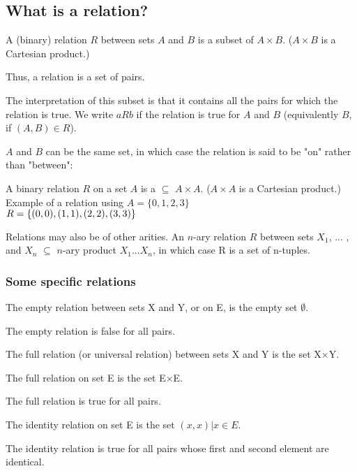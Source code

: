 \subsection{What is a relation?}

A (binary) relation $R$ between sets $A$ and $B$ is a subset of $A \times B$. ($A \times B$ is a Cartesian product.) 

Thus, a relation is a set of pairs. 

The interpretation of this subset is that it contains all the pairs for which the relation is true.  We write $aRb$ if the relation is true for $A$ and $B$ (equivalently $B$, if $(A,B) \in R$). 

$A$ and $B$ can be the same set, in which case the relation is said to be "on" rather than "between":

A binary relation $R$ on a set $A$ is a $\subseteq$ $A \times A$. ($A \times A$ is a Cartesian product.) \\

Example of a relation using $A = \{0,1,2,3\}$ \\

 \begin{math}
    R = \{(0,0),(1,1),(2,2),(3,3)\}  \\
\end{math}

Relations may also be of other arities.  An $n$-ary relation $R$ between sets $X_{1}$, ... , and $X_{n}$ $\subseteq$  $n$-ary product $X_{1}$...$X_{n}$, in which case R is a set of n-tuples. 

\subsubsection{Some specific relations}
The empty relation between sets X and Y, or on E, is the empty set $\emptyset$. 

The empty relation is false for all pairs. 

The full relation (or universal relation) between sets X and Y is the set X$\times$Y. 

The full relation on set E is the set E$\times$E. 

The full relation is true for all pairs. 

The identity relation on set E is the set ${(x,x) | x\in{E}}$. 

The identity relation is true for all pairs whose first and second element are identical. 



